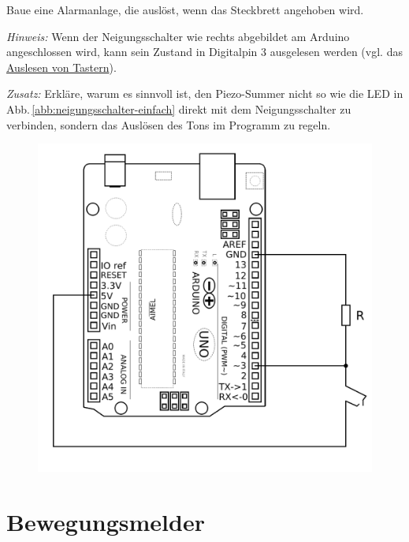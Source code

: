 \begin{minipage}[t]{0.55\textwidth}
	\begin{projekt}[Alarmanlage]\label{proj:neigungsalarmanlage}
		Baue eine Alarmanlage, die auslöst, wenn das Steckbrett angehoben wird.
		
		\emph{Hinweis:} Wenn der Neigungsschalter wie rechts abgebildet am Arduino angeschlossen wird, kann sein Zustand in Digitalpin 3 ausgelesen werden (vgl. das \href{sec:taster}{Auslesen von Tastern}).
		
		\emph{Zusatz:} Erkläre, warum es sinnvoll ist, den Piezo-Summer nicht so wie die LED in Abb.\,\ref{abb:neigungsschalter-einfach} direkt mit dem Neigungsschalter zu verbinden, sondern das Auslösen des Tons im Programm zu regeln.
	\end{projekt}
\end{minipage}
\hfill
\begin{minipage}[t]{0.44\textwidth}
	\begin{figure}[H]
		\centering
		\includegraphics[width=\textwidth]{./Zeichnungen/neigungsschalter-mit-arduino.png}
	\end{figure}
\end{minipage}


\newpage
\section{Bewegungsmelder}
\label{sec:bewegungsmelder}
\setcounter{aufgabennummer}{0}
\setcounter{projektnummer}{0}

